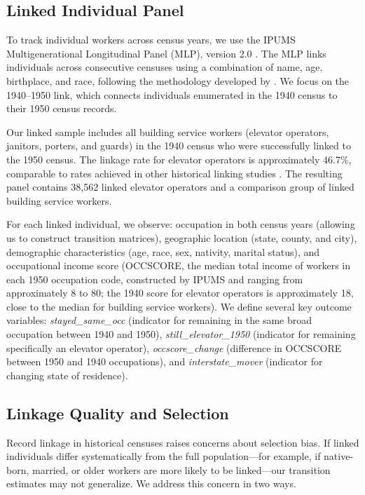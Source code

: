 \documentclass[12pt]{article}
\begin{document}
\subsection{Linked Individual Panel}

To track individual workers across census years, we use the IPUMS Multigenerational Longitudinal Panel (MLP), version 2.0 \citep{ruggles2021}. The MLP links individuals across consecutive censuses using a combination of name, age, birthplace, and race, following the methodology developed by \citet{abramitzky2021}. We focus on the 1940--1950 link, which connects individuals enumerated in the 1940 census to their 1950 census records.

Our linked sample includes all building service workers (elevator operators, janitors, porters, and guards) in the 1940 census who were successfully linked to the 1950 census. The linkage rate for elevator operators is approximately 46.7\%, comparable to rates achieved in other historical linking studies \citep{abramitzky2012}. The resulting panel contains 38,562 linked elevator operators and a comparison group of linked building service workers.

For each linked individual, we observe: occupation in both census years (allowing us to construct transition matrices), geographic location (state, county, and city), demographic characteristics (age, race, sex, nativity, marital status), and occupational income score (OCCSCORE, the median total income of workers in each 1950 occupation code, constructed by IPUMS and ranging from approximately 8 to 80; the 1940 score for elevator operators is approximately 18, close to the median for building service workers). We define several key outcome variables: \emph{stayed\_same\_occ} (indicator for remaining in the same broad occupation between 1940 and 1950), \emph{still\_elevator\_1950} (indicator for remaining specifically an elevator operator), \emph{occscore\_change} (difference in OCCSCORE between 1950 and 1940 occupations), and \emph{interstate\_mover} (indicator for changing state of residence).

\subsection{Linkage Quality and Selection}

Record linkage in historical censuses raises concerns about selection bias. If linked individuals differ systematically from the full population---for example, if native-born, married, or older workers are more likely to be linked---our transition estimates may not generalize. We address this concern in two ways.
\end{document}
